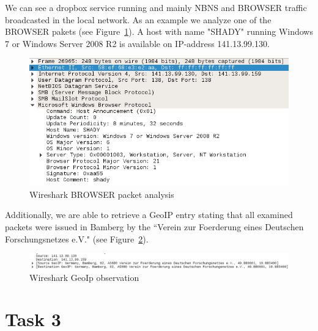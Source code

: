 \documentclass[12pt]{article}
\begin{document}
We can see a dropbox service running and mainly NBNS and BROWSER traffic broadcasted in the local network. As an example we analyze one of the BROWSER pakets (see Figure~\ref{img_wireshark_browser}).
A host with name "SHADY" running Windows 7 or Windows Server 2008 R2 is available on IP-address 141.13.99.130.

\begin{figure}[h]%
\centering%
\includegraphics[width=\textwidth]{images/wireshark_browser.png}%
\caption{Wireshark BROWSER packet analysis}%
\label{img_wireshark_browser}%
\end{figure}%

Additionally, we are able to retrieve a GeoIP entry stating that all examined packets were issued in Bamberg by the ``Verein zur Foerderung eines Deutschen Forschungsnetzes e.V." (see Figure~\ref{img_wireshark_geoip}).

\begin{figure}[h]%
\centering%
\includegraphics[width=\textwidth]{images/wireshark_geoip.png}%
\caption{Wireshark GeoIp observation}%
\label{img_wireshark_geoip}%
\end{figure}%


\section{Task 3}\label{task3}
\end{document}
